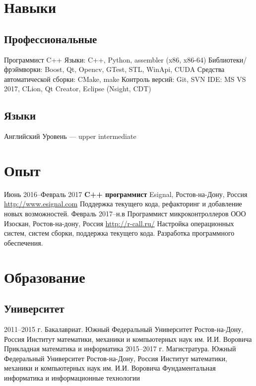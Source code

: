 \documentclass[11pt,a4paper]{moderncv}
\begin{document}
\maketitle

\section{Навыки}
  \subsection{Профессиональные}
    \cvline
    {Программист C++}
      {
      Языки: C++, Python, assembler (x86, x86-64)\newline{}
      Библиотеки/фрэймворки: Boost, Qt, Opencv, GTest, STL, WinApi, CUDA \newline{}
      Средства автоматической сборки: CMake, make \newline{}
      Контроль версий: Git, SVN \newline{}
      IDE: MS VS 2017, CLion, Qt Creator, Eclipse (Nsight, CDT)
      }
  \subsection{Языки}
    \cvline
    {Английский}
      {
      Уровень --- upper intermediate \newline{}
      }

\section{Опыт}
\cventry
  {Июнь 2016--Февраль 2017}
  {\bfseries C++ программист}
  {Esignal, Ростов-на-Дону, Россия}
  {\newline{}\url{http://www.esignal.com}}{}
  {Поддержка текущего кода, рефакторинг и добавление новых возможностей.}
\cventry
  {Февраль 2017--н.в}
  {Программист микроконтроллеров}
  {ООО Изоскан, Ростов-на-дону, Россия}
  {\newline{}\url{http://r-call.ru/}}{}
  {Настройка операционных систем, систем сборки, поддержка текущего кода. Разработка программного обеспечения.}

\section{Образование}
  \subsection{Университет}
    \cventry
      {2011--2015 г.}
      {Бакалавриат. Южный Федеральный Университет}
      {Ростов-на-Дону, Россия}
      {Институт математики, механики и компьютерных наук им. И.И. Воровича}
      {Прикладная математика и информатика}
      {}
    \cventry
      {2015--2017 г.}
      {Магистратура. Южный Федеральный Университет}
      {Ростов-на-Дону, Россия}
      {Институт математики, механики и компьютерных наук им. И.И. Воровича}
      {Фундаментальная информатика и информационные технологии}
      {}
\end{document}
